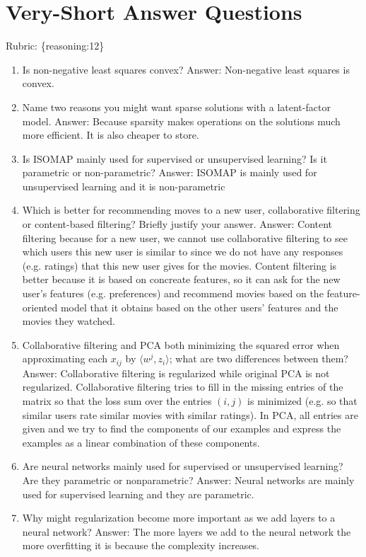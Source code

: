 \documentclass{article}
\def\rubric#1{\gre{Rubric: \{#1\}}}{}
\def\gre#1{{\color{gre}#1}}
\def\ans#1{\gre{Answer: #1}}{}
\def\enum#1{\begin{enumerate}#1\end{enumerate}}
\begin{document}
\section{Very-Short Answer Questions}
\rubric{reasoning:12}

\enum{
\item Is non-negative least squares convex?
\ans{Non-negative least squares is convex.}
\item Name two reasons you might want sparse solutions with a latent-factor model.
\ans{Because sparsity makes operations on the solutions much more efficient. It is also cheaper to store.}
\item Is ISOMAP mainly used for supervised or unsupervised learning? Is it parametric or non-parametric?
\ans{ISOMAP is mainly used for unsupervised learning and it is non-parametric}
\item Which is better for recommending moves to a new user, collaborative filtering or content-based filtering? Briefly justify your answer.
\ans{Content filtering because for a new user, we cannot use collaborative filtering to see which users this new user is similar to since we do not have any responses (e.g. ratings) that this new user gives for the movies. Content filtering is better because it is based on concreate features, so it can ask for the new user's features (e.g. preferences) and recommend movies based on the feature-oriented model that it obtains based on the other users' features and the movies they watched.}
\item Collaborative filtering and PCA both minimizing the squared error when approximating each $x_{ij}$ by $\langle w^j, z_i\rangle$; what are two differences between them?
\ans{Collaborative filtering is regularized while original PCA is not regularized. Collaborative filtering tries to fill in the missing entries of the matrix so that the loss sum over the entries $(i,j)$ is minimized (e.g. so that similar users rate similar movies with similar ratings). In PCA, all entries are given and we try to find the components of our examples and express the examples as a linear combination of these components.}
\item{Are neural networks mainly used for supervised or unsupervised learning? Are they parametric or nonparametric?}
\ans{Neural networks are mainly used for supervised learning and they are parametric.}
\item{Why might regularization become more important as we add layers to a neural network?}
\ans{The more layers we add to the neural network the more overfitting it is because the complexity increases.}
}
\end{document}
